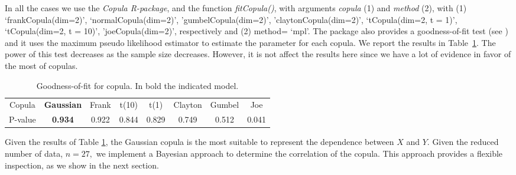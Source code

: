 \documentclass{aip-cp}
\begin{document}
In all the cases we use the {\it{Copula R-package}}, and the function {\it{fitCopula()}}, with arguments \textit{copula} (1) and \textit{method} (2), with (1) `frankCopula(dim=2)', `normalCopula(dim=2)',  'gumbelCopula(dim=2)', 'claytonCopula(dim=2)', `tCopula(dim=2, t = 1)',  `tCopula(dim=2, t = 10)',   'joeCopula(dim=2)', respectively  and (2) method= `mpl'.
The package also provides a goodness-of-fit test (see \cite{genest}) and it uses the maximum pseudo likelihood estimator to estimate the parameter for each copula. We report the results in Table~\ref{tabla1}. The power of this test decreases as the sample size decreases. However, it is not affect the results here since we have a lot of evidence in favor of the most of copulas.
%
\begin{center}
\begin{table}[!h]
\caption{Goodness-of-fit for copula. In bold the indicated model.}
\label{tabla1}
\centering
\begin{tabular}{c|c|c|c|c|c|c|c}
Copula&  {\bf{Gaussian}} & Frank &  t(10) & t(1) &Clayton & Gumbel & Joe \\
P-value&  {\bf{0.934}} & 0.922 & 0.844  &  0.829 & 0.749 & 0.512 & 0.041
\end{tabular}
\end{table}
\end{center}

%
Given the results of Table \ref{tabla1}, the Gaussian copula is the most suitable to represent the dependence between $X$ and $Y.$ Given the reduced number of data, $n=27,$ we implement a Bayesian approach to determine the correlation of the copula. This approach provides a flexible inspection, as we show in the next section.\\
\end{document}
